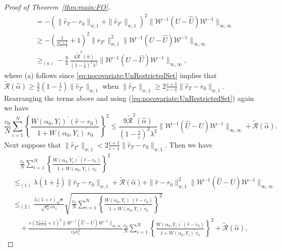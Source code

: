 \documentclass[11pt]{article}
\begin{document}
\begin{proof}[Proof of Theorem~\ref{thm:main:FO}]
$$\begin{array}{rl}
&\displaystyle=   -(\|\hat r_T - r_0\|_{w,1} + \| \hat r_{T^c}\|_{w,1})^2 \|\mathcal{W}^{-1}(U-\hat U)\mathcal{W}^{-1}\|_{\infty,\infty}\\
&\displaystyle \geq -\left(\frac{1}{2\frac{c+1}{c-1}} + 1\right)^2\| \hat r_{T^c}\|_{w,1}^2 \|\mathcal{W}^{-1}(U-\hat U)\mathcal{W}^{-1}\|_{\infty,\infty}\\
&\displaystyle\geq_{(a)}  - \frac{9}{4}\ \frac{4\widetilde{\mathcal{R}}^2(\hat\alpha)}{\mbox{$(1-\frac{1}{c})^2$}\lambda^2} \|\mathcal{W}^{-1}(U-\hat U)\mathcal{W}^{-1}\|_{\infty,\infty},
\end{array}$$
where (a) follows since \eqref{eq:nocovariate:UnRestrictedSet} implies that $\widetilde{\mathcal{R}}(\hat\alpha)\geq\frac{\lambda}{2}\left(1-\frac{1}{c}\right)\|\hat r_{T^c}\|_{w,1}$ when $\|\hat r_{T^c}\|_{w,1} \geq 2\frac{c+1}{c-1}\|\hat r_T - r_0\|_{w,1}$. Rearranging the terms above and using (\ref{eq:nocovariate:UnRestrictedSet}) again we have
$$\frac{c_0}{N}\sum_{i=1}^N\left\{\frac{W(\alpha_0,Y_i)^\prime(\hat{r}-r_0)}{1+W(\alpha_0,Y_i)^\prime r_0}\right\}^2 \leq  \frac{9\widetilde{\mathcal{R}}^2(\hat\alpha)}{\mbox{$(1-\frac{1}{c})^2$}\lambda^2} \|\mathcal{W}^{-1}(\hat U - U)\mathcal{W}^{-1} \|_{\infty,\infty} + \widetilde{\mathcal{R}}(\hat\alpha).$$ 
Next suppose that  $\|\hat r_{T^c}\|_{w,1} < 2\frac{c+1}{c-1}\|\hat r_T - r_0\|_{w,1}$. Then we have 
$$\begin{array}{rl}
&\quad\displaystyle\frac{c_0}{N} \sum_{i=1}^N\left\{\frac{W(\alpha_0,Y_i)^\prime(\hat{r}-r_0)}{1+W(\alpha_0,Y_i)^\prime r_0}\right\}^2\\
&\displaystyle \leq_{(1)}\lambda(1+\frac{1}{c})\|\hat r_{T} - r_0\|_{w,1}+\widetilde{\mathcal{R}}(\hat\alpha)+\|\hat r - r_0\|_{w,1}^2 \|\mathcal{W}^{-1}(\hat U - U)\mathcal{W}^{-1} \|_{\infty,\infty}\\
&\displaystyle \leq_{(2)}\frac{\lambda(1+c)\sqrt{s}}{\sqrt{c_0}c\kappa_{\bar c}}\!\!\sqrt{\frac{c_0}{N} \!\!\sum_{i=1}^N\left\{\frac{W(\alpha_0,Y_i)^\prime(\hat{r}-r_0)}{1+W(\alpha_0,Y_i)^\prime r_0}\right\}^2}  \\
&\displaystyle\quad+\frac{s\left(2\frac{c+1}{c-1}+1\right)^2\|\mathcal{W}^{-1}(\hat U - U)\mathcal{W}^{-1} \|_{\infty,\infty} }{c_0\kappa_{\bar c}^2}\frac{c_0}{N} \sum_{i=1}^N\left\{\frac{W(\alpha_0,Y_i)^\prime(\hat{r}-r_0)}{1+W(\alpha_0,Y_i)^\prime r_0}\right\}^2  + \widetilde{\mathcal{R}}(\hat\alpha),
\end{array}$$

\end{proof}
\end{document}
